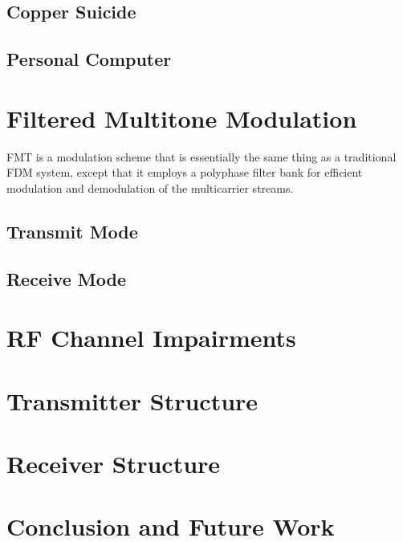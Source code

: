 \documentclass[conference]{IEEEtran}
\begin{document}
\subsection*{Copper Suicide}



\subsection*{Personal Computer}



\section{Filtered Multitone Modulation}
\label{sec:FMTintro}

FMT is a modulation scheme that is essentially the same thing as a
traditional FDM system, except that it employs a polyphase filter
bank for efficient modulation and demodulation of the multicarrier
streams.

\subsection*{Transmit Mode}

\subsection*{Receive Mode}

\section{RF Channel Impairments}
\label{sec:chan}


\section{Transmitter Structure}
\label{sec:tx}

\section{Receiver Structure}
\label{sec:rx}

\section{Conclusion and Future Work}
\label{sec:conc}
\end{document}
